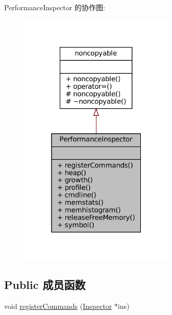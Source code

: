 Performance\+Inspector 的协作图\+:
\nopagebreak
\begin{figure}[H]
\begin{center}
\leavevmode
\includegraphics[width=211pt]{classmuduo_1_1net_1_1PerformanceInspector__coll__graph}
\end{center}
\end{figure}
\subsection*{Public 成员函数}
\begin{DoxyCompactItemize}
\item 
void \hyperlink{classmuduo_1_1net_1_1PerformanceInspector_ac4da0c5db63e529c730df0c77175882e}{register\+Commands} (\hyperlink{classmuduo_1_1net_1_1Inspector}{Inspector} $\ast$ins)
\end{DoxyCompactItemize}
